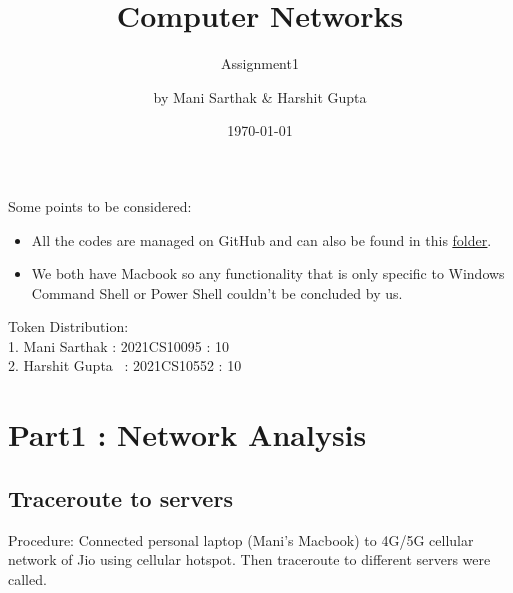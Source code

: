 \documentclass[11pt]{scrartcl}
\author{ by Mani Sarthak \& Harshit Gupta}
\date{\today}
\title{Computer Networks}
\subtitle{Assignment1}
\begin{document}
\maketitle

Some points to be considered:
\begin{itemize}
    
    \item All the codes are managed on GitHub and can also be found in this \href{https://drive.google.com/drive/folders/1QKKCJGQ5x3ZLXGFgR8Z5mXXcyV3pBJWg?usp=sharing}{\underline{folder}}. 
    \item We both have Macbook so any functionality that is only specific to Windows Command Shell or Power Shell couldn't be concluded by us.
    

    
    
\end{itemize}

\vfill
\begin{center}
   Token Distribution:
\\
1. Mani Sarthak : 2021CS10095 : 10
\\
2. Harshit Gupta \ : 2021CS10552 : 10 
\end{center}




\newpage
\section{ Part1 : Network Analysis}
\subsection{Traceroute to servers}
Procedure: Connected personal laptop (Mani's Macbook) to 4G/5G cellular network of Jio using cellular hotspot. Then traceroute to different servers were called.
\end{document}
